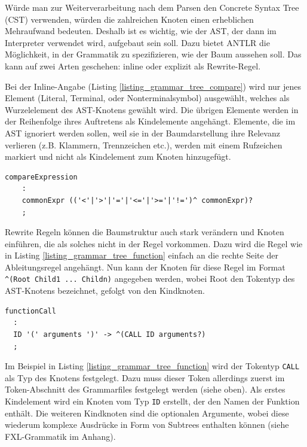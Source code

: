 Würde man zur Weiterverarbeitung nach dem Parsen den Concrete Syntax Tree (CST) verwenden, würden die zahlreichen Knoten einen erheblichen Mehraufwand bedeuten. Deshalb ist es wichtig, wie der AST, der dann im Interpreter verwendet wird, aufgebaut sein soll. Dazu bietet ANTLR die Möglichkeit, in der Grammatik zu spezifizieren, wie der Baum aussehen soll. Das kann auf zwei Arten geschehen: inline oder explizit als Rewrite-Regel.

Bei der Inline-Angabe (Listing \ref{listing_grammar_tree_compare}) wird nur jenes Element (Literal, Terminal, oder Nonterminalsymbol) ausgewählt, welches als Wurzelelement des AST-Knotens gewählt wird. Die übrigen Elemente werden in der Reihenfolge ihres Auftretens als Kindelemente angehängt. Elemente, die im AST ignoriert werden sollen, weil sie in der Baumdarstellung ihre Relevanz verlieren (z.B. Klammern, Trennzeichen etc.), werden mit einem Rufzeichen markiert und nicht als Kindelement zum Knoten hinzugefügt.


\begin{lstlisting}[float = htbp,caption={Inline-Regeln zur Beschreibung der Baumstruktur.},label=listing_grammar_tree_compare]
compareExpression
  	:
  	commonExpr (('<'|'>'|'='|'<='|'>='|'!=')^ commonExpr)?
  	;

\end{lstlisting}

Rewrite Regeln können die Baumstruktur auch stark verändern und Knoten einführen, die als solches nicht in der Regel vorkommen. Dazu wird die Regel wie in Listing \ref{listing_grammar_tree_function} einfach an die rechte Seite der Ableitungsregel angehängt. Nun kann der Knoten für diese Regel im Format \texttt{\textasciicircum(Root Child1 ... Childn)} angegeben werden, wobei Root den Tokentyp des AST-Knotens bezeichnet, gefolgt von den Kindknoten. 


\begin{lstlisting}[float = htbp,caption={Rewrite-Regeln zur Beschreibung der Baumstruktur.},label=listing_grammar_tree_function]
functionCall
  :
  ID '(' arguments ')' -> ^(CALL ID arguments?)
  ;
\end{lstlisting}

Im Beispiel in Listing \ref{listing_grammar_tree_function} wird der Tokentyp \texttt{CALL} als Typ des Knotens festgelegt. Dazu muss dieser Token allerdings zuerst im Token-Abschnitt des Grammarfiles festgelegt werden (siehe oben). Als erstes Kindelement wird ein Knoten vom Typ \texttt{ID} erstellt, der den Namen der Funktion enthält. Die weiteren Kindknoten sind die optionalen Argumente, wobei diese wiederum komplexe Ausdrücke in Form von Subtrees enthalten können (siehe FXL-Grammatik im Anhang).


